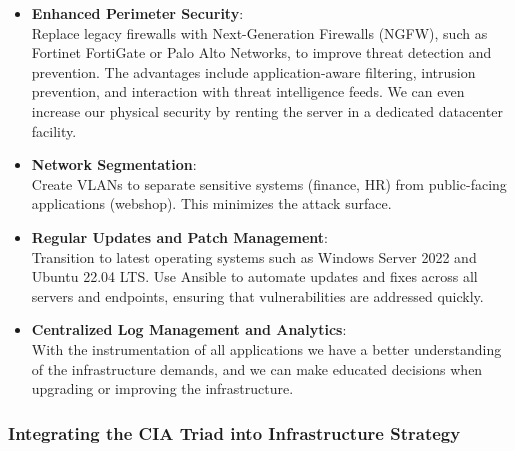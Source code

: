 \documentclass{llncs}
\begin{document}
\begin{itemize}
  \item \textbf{Enhanced Perimeter Security}:
        \\
        Replace legacy firewalls with Next-Generation Firewalls (NGFW), such as Fortinet FortiGate or Palo Alto Networks, to improve threat detection and prevention.
        The advantages include application-aware filtering, intrusion prevention, and interaction with threat intelligence feeds.
        We can even increase our physical security by renting the server in a dedicated datacenter facility.
        \\
  \item \textbf{Network Segmentation}:
        \\ 
        Create VLANs to separate sensitive systems (finance, HR) from public-facing applications (webshop). This minimizes the attack surface.
        \\    
  \item \textbf{Regular Updates and Patch Management}:
        \\ 
        Transition to latest operating systems such as Windows Server 2022 and Ubuntu 22.04 LTS.
        Use Ansible to automate updates and fixes across all servers and endpoints, ensuring that vulnerabilities are addressed quickly.
        \\ 
  \item \textbf{Centralized Log Management and Analytics}:
        \\ 
        With the instrumentation of all applications we have a better understanding of the infrastructure demands, and we can make educated decisions when upgrading or improving the infrastructure.
        \\ 
\end{itemize}

\subsubsection*{Integrating the CIA Triad into Infrastructure Strategy}
\phantom{.}
\end{document}
